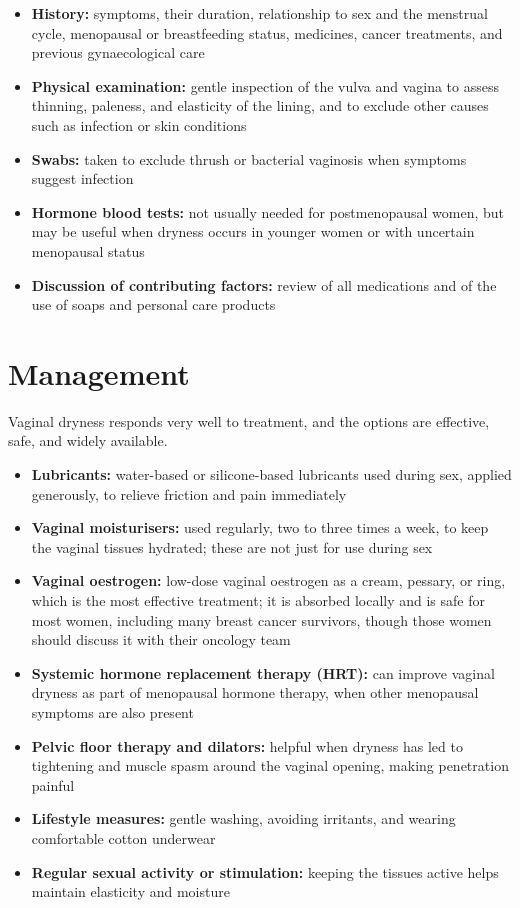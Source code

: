 \begin{itemize}
    \item \textbf{History:} symptoms, their duration, relationship to sex and the menstrual cycle, menopausal or breastfeeding status, medicines, cancer treatments, and previous gynaecological care
    \item \textbf{Physical examination:} gentle inspection of the vulva and vagina to assess thinning, paleness, and elasticity of the lining, and to exclude other causes such as infection or skin conditions
    \item \textbf{Swabs:} taken to exclude thrush or bacterial vaginosis when symptoms suggest infection
    \item \textbf{Hormone blood tests:} not usually needed for postmenopausal women, but may be useful when dryness occurs in younger women or with uncertain menopausal status
    \item \textbf{Discussion of contributing factors:} review of all medications and of the use of soaps and personal care products
\end{itemize}

\section*{Management}
Vaginal dryness responds very well to treatment, and the options are effective, safe, and widely available.

\begin{itemize}
    \item \textbf{Lubricants:} water-based or silicone-based lubricants used during sex, applied generously, to relieve friction and pain immediately
    \item \textbf{Vaginal moisturisers:} used regularly, two to three times a week, to keep the vaginal tissues hydrated; these are not just for use during sex
    \item \textbf{Vaginal oestrogen:} low-dose vaginal oestrogen as a cream, pessary, or ring, which is the most effective treatment; it is absorbed locally and is safe for most women, including many breast cancer survivors, though those women should discuss it with their oncology team
    \item \textbf{Systemic hormone replacement therapy (HRT):} can improve vaginal dryness as part of menopausal hormone therapy, when other menopausal symptoms are also present
    \item \textbf{Pelvic floor therapy and dilators:} helpful when dryness has led to tightening and muscle spasm around the vaginal opening, making penetration painful
    \item \textbf{Lifestyle measures:} gentle washing, avoiding irritants, and wearing comfortable cotton underwear
    \item \textbf{Regular sexual activity or stimulation:} keeping the tissues active helps maintain elasticity and moisture
\end{itemize}

